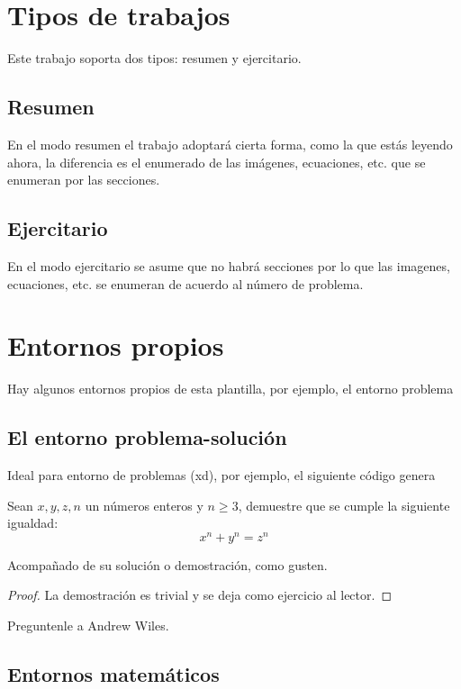 \newpage
\section{Tipos de trabajos}
Este trabajo soporta dos tipos: resumen y ejercitario.

\subsection{Resumen}
En el modo resumen el trabajo adoptará cierta forma, como la que estás leyendo ahora, la diferencia es el enumerado de las imágenes, ecuaciones, etc. que se enumeran por las secciones.

\subsection{Ejercitario}
En el modo ejercitario se asume que no habrá secciones por lo que las imagenes, ecuaciones, etc. se enumeran de acuerdo al número de problema.


\section{Entornos propios}
Hay algunos entornos propios de esta plantilla, por ejemplo, el entorno problema 

\subsection{El entorno problema-solución}
Ideal para entorno de problemas (xd), por ejemplo, el siguiente código genera 


\begin{problema}
    Sean $x, y, z, n$ un números enteros y $n \ge 3$, demuestre que se cumple la siguiente igualdad:
    $$ x^n + y^n = z^n $$
\end{problema}

Acompañado de su solución o demostración, como gusten.

\begin{proof}
    La demostración es trivial y se deja como ejercicio al lector.
\end{proof}


\begin{solucion}
    Preguntenle a Andrew Wiles.
\end{solucion}

\newpage
\subsection{Entornos matemáticos}

